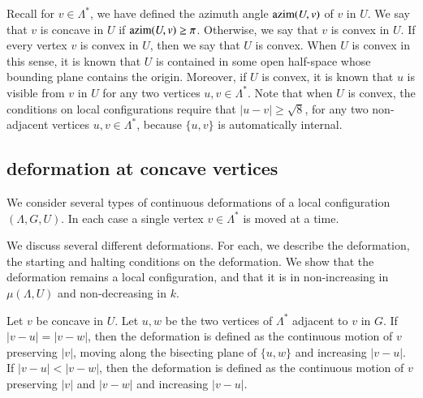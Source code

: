 Recall for $v\in\Lambda^*$, we have defined the azimuth angle
${\operatorname{azim}}(U,v)$ of $v$ in $U$.  We say that $v$ is concave in $U$
if ${\operatorname{azim}}(U,v)\ge\pi$.  Otherwise, we say that $v$ is convex
in $U$.  If every vertex $v$ is convex in $U$, then we say that $U$
is convex.  When $U$ is convex in this sense, it is known that $U$
is contained in some open half-space whose bounding plane
contains the origin.  Moreover,
if $U$ is convex,
it is known that $u$ is visible from $v$ in $U$
for any two vertices $u,v\in\Lambda^*$.  Note that when $U$ is 
convex, the conditions on local configurations require that
$|u-v|\ge\sqrt8$, for any two non-adjacent vertices $u,v\in\Lambda^*$,
because $\{u,v\}$ is automatically internal.

\subsection{deformation at concave vertices}

We consider several types of continuous 
deformations of a local configuration
$(\Lambda,G,U)$.  In each case a single vertex $v\in\Lambda^*$ is
moved at a time.

We discuss several different  deformations.  For each,
we describe the deformation, the starting and halting conditions on 
the deformation.  We show that the deformation remains a local configuration, and that it is in non-increasing in $\mu(\Lambda,U)$
and non-decreasing in $k$.



Let $v$ be concave in $U$.  Let $u,w$ be the two vertices of
$\Lambda^*$ adjacent to $v$ in $G$. 
If $|v-u|=|v-w|$, then the deformation is defined as the continuous motion
of $v$ preserving $|v|$,  moving along the bisecting plane of $\{u,w\}$
and increasing $|v-u|$.  If $|v-u|<|v-w|$, then the deformation
is defined as the continuous motion of $v$ preserving $|v|$ and
$|v-w|$ and increasing $|v-u|$.

